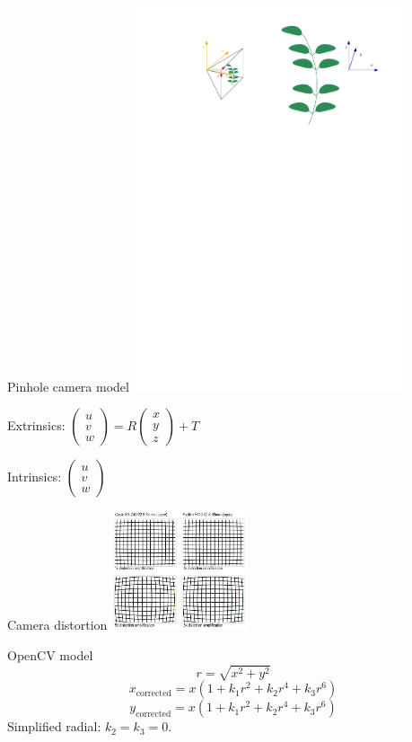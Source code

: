 \documentclass{beamer}
\begin{document}
\begin{frame}{Pinhole camera model}
    \centering
    \includegraphics[width=0.6\textwidth]{images/reperes.pdf}

    Extrinsics: $\left( \begin{array}{c}
            u \\ v \\ w
            \end{array} \right)= R\left( \begin{array}{c}
            x \\ y \\ z
    \end{array} \right) + T$

    Intrinsics: $\left( \begin{array}{c}
            u \\ v \\ w
    \end{array} \right)$
\end{frame}
\begin{frame}{Camera distortion}
    \centering
    \includegraphics[width=0.3\textwidth]{images/qwe_download.png}
    \begin{block}{OpenCV model}
        \[
            r = \sqrt{x^2 + y^2}
        \]
        \[
            x_{\textrm{corrected}} = x(1+k_1r^2 + k_2r^4 + k_3r^6)
        \]
        \[
            y_{\textrm{corrected}} = x(1+k_1r^2 + k_2r^4 + k_3r^6)
        \]
        Simplified radial:
        $k_2 = k_3 = 0.$
    \end{block}

\end{frame}
\end{document}
